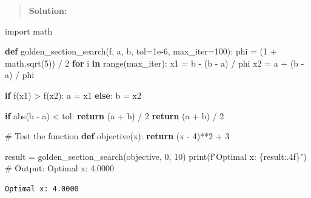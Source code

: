 \documentclass[
  letterpaper,
  DIV=11,
  numbers=noendperiod]{scrreprt}
\newenvironment{Shaded}{\begin{snugshade}}{\end{snugshade}}
\newcommand{\BuiltInTok}[1]{\textcolor[rgb]{0.00,0.23,0.31}{#1}}
\newcommand{\CommentTok}[1]{\textcolor[rgb]{0.37,0.37,0.37}{#1}}
\newcommand{\ControlFlowTok}[1]{\textcolor[rgb]{0.00,0.23,0.31}{\textbf{#1}}}
\newcommand{\DecValTok}[1]{\textcolor[rgb]{0.68,0.00,0.00}{#1}}
\newcommand{\FloatTok}[1]{\textcolor[rgb]{0.68,0.00,0.00}{#1}}
\newcommand{\ImportTok}[1]{\textcolor[rgb]{0.00,0.46,0.62}{#1}}
\newcommand{\KeywordTok}[1]{\textcolor[rgb]{0.00,0.23,0.31}{\textbf{#1}}}
\newcommand{\NormalTok}[1]{\textcolor[rgb]{0.00,0.23,0.31}{#1}}
\newcommand{\OperatorTok}[1]{\textcolor[rgb]{0.37,0.37,0.37}{#1}}
\newcommand{\SpecialCharTok}[1]{\textcolor[rgb]{0.37,0.37,0.37}{#1}}
\newcommand{\SpecialStringTok}[1]{\textcolor[rgb]{0.13,0.47,0.30}{#1}}
\begin{document}
\begin{quote}
\textbf{Solution:}
\end{quote}

\begin{Shaded}
\begin{Highlighting}[]
\ImportTok{import}\NormalTok{ math}

\KeywordTok{def}\NormalTok{ golden\_section\_search(f, a, b, tol}\OperatorTok{=}\FloatTok{1e{-}6}\NormalTok{, max\_iter}\OperatorTok{=}\DecValTok{100}\NormalTok{):}
\NormalTok{    phi }\OperatorTok{=}\NormalTok{ (}\DecValTok{1} \OperatorTok{+}\NormalTok{ math.sqrt(}\DecValTok{5}\NormalTok{)) }\OperatorTok{/} \DecValTok{2}
    \ControlFlowTok{for}\NormalTok{ i }\KeywordTok{in} \BuiltInTok{range}\NormalTok{(max\_iter):}
\NormalTok{        x1 }\OperatorTok{=}\NormalTok{ b }\OperatorTok{{-}}\NormalTok{ (b }\OperatorTok{{-}}\NormalTok{ a) }\OperatorTok{/}\NormalTok{ phi}
\NormalTok{        x2 }\OperatorTok{=}\NormalTok{ a }\OperatorTok{+}\NormalTok{ (b }\OperatorTok{{-}}\NormalTok{ a) }\OperatorTok{/}\NormalTok{ phi}
        
        \ControlFlowTok{if}\NormalTok{ f(x1) }\OperatorTok{\textgreater{}}\NormalTok{ f(x2):}
\NormalTok{            a }\OperatorTok{=}\NormalTok{ x1}
        \ControlFlowTok{else}\NormalTok{:}
\NormalTok{            b }\OperatorTok{=}\NormalTok{ x2}
            
        \ControlFlowTok{if} \BuiltInTok{abs}\NormalTok{(b }\OperatorTok{{-}}\NormalTok{ a) }\OperatorTok{\textless{}}\NormalTok{ tol:}
            \ControlFlowTok{return}\NormalTok{ (a }\OperatorTok{+}\NormalTok{ b) }\OperatorTok{/} \DecValTok{2}
    \ControlFlowTok{return}\NormalTok{ (a }\OperatorTok{+}\NormalTok{ b) }\OperatorTok{/} \DecValTok{2}

\CommentTok{\# Test the function}
\KeywordTok{def}\NormalTok{ objective(x):}
    \ControlFlowTok{return}\NormalTok{ (x }\OperatorTok{{-}} \DecValTok{4}\NormalTok{)}\OperatorTok{**}\DecValTok{2} \OperatorTok{+} \DecValTok{3}

\NormalTok{result }\OperatorTok{=}\NormalTok{ golden\_section\_search(objective, }\DecValTok{0}\NormalTok{, }\DecValTok{10}\NormalTok{)}
\BuiltInTok{print}\NormalTok{(}\SpecialStringTok{f"Optimal x: }\SpecialCharTok{\{}\NormalTok{result}\SpecialCharTok{:.4f\}}\SpecialStringTok{"}\NormalTok{)  }\CommentTok{\# Output: Optimal x: 4.0000}
\end{Highlighting}
\end{Shaded}

\begin{verbatim}
Optimal x: 4.0000
\end{verbatim}
\end{document}
